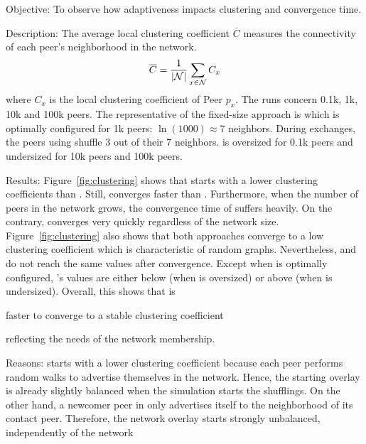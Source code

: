 \begin{asparadesc}
\item[Objective:] To observe how adaptiveness impacts clustering and convergence
  time.
\item[Description:] The average local clustering coefficient $\overline{C}$ measures
  the connectivity of each peer's neighborhood in the network.
  \begin{equation}
    \overline{C} = {1\over |\mathcal{N}|}\sum\limits_{x\in\mathcal{N}}C_x
  \end{equation}
  where $C_x$ is the local clustering coefficient of Peer $p_x$.  The
  runs concern 0.1k, 1k, 10k and 100k peers. The representative of the
  fixed-size approach is \CYCLON which is optimally configured for 1k
  peers: $\ln(1000)\approx 7$ neighbors. During exchanges, the peers
  using \CYCLON shuffle $3$ out of their $7$ neighbors. \CYCLON is
  oversized for 0.1k peers and undersized for 10k peers and 100k
  peers.
\item[Results:] Figure~\ref{fig:clustering} shows that \CYCLON starts
  with a lower clustering coefficients than \SPRAY. Still, \SPRAY
  converges faster than \CYCLON. Furthermore, when the number of peers
  in the network grows, the convergence time of \CYCLON suffers
  heavily. On the contrary, \SPRAY converges very quickly
  regardless of the network size. Figure~\ref{fig:clustering} also
  shows that both approaches converge to a low clustering coefficient
  which is characteristic of random graphs. Nevertheless, \CYCLON and
  \SPRAY do not reach the same values after convergence. Except when
  \CYCLON is optimally configured, \SPRAY's values are either below
  (when \CYCLON is oversized) or above (when \CYCLON is undersized).
  Overall, this shows that \SPRAY is
  \begin{inparaenum}
  \item faster to converge to a stable clustering coefficient
  \item reflecting the needs of the network membership.
  \end{inparaenum}
\item[Reasons:] \CYCLON starts with a lower clustering coefficient
  because each peer performs random walks to advertise themselves in
  the network. Hence, the starting overlay is already slightly
  balanced when the simulation starts the shufflings. On the other
  hand, a newcomer peer in \SPRAY only advertises itself to the
  neighborhood of its contact peer. Therefore, the network overlay
  starts strongly unbalanced, independently of the network

\end{asparadesc}
